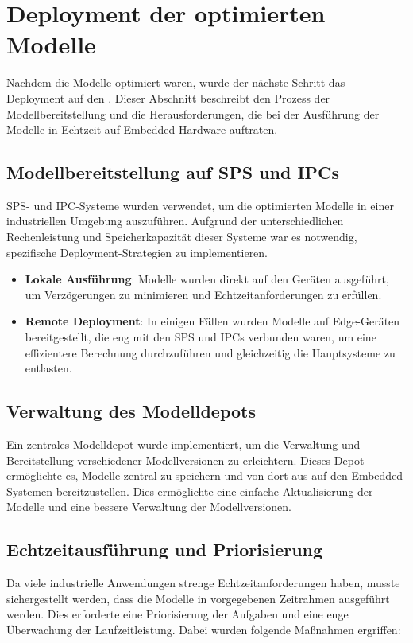 \section{Deployment der optimierten Modelle}
Nachdem die Modelle optimiert waren, wurde der nächste Schritt das Deployment auf den \Emb. Dieser Abschnitt beschreibt den Prozess der Modellbereitstellung 
und die Herausforderungen, die bei der Ausführung der Modelle in Echtzeit auf Embedded-Hardware auftraten.

\subsection{Modellbereitstellung auf SPS und IPCs}
SPS- und IPC-Systeme wurden verwendet, um die optimierten Modelle in einer industriellen Umgebung auszuführen. Aufgrund der unterschiedlichen Rechenleistung und 
Speicherkapazität dieser Systeme war es notwendig, spezifische Deployment-Strategien zu implementieren.

\begin{itemize}
    \item \textbf{Lokale Ausführung}: Modelle wurden direkt auf den Geräten ausgeführt, um Verzögerungen zu minimieren und Echtzeitanforderungen zu erfüllen.
    \item \textbf{Remote Deployment}: In einigen Fällen wurden Modelle auf Edge-Geräten bereitgestellt, die eng mit den SPS und IPCs verbunden waren, um eine 
    effizientere Berechnung durchzuführen und gleichzeitig die Hauptsysteme zu entlasten.
\end{itemize}

\subsection{Verwaltung des Modelldepots}
Ein zentrales Modelldepot wurde implementiert, um die Verwaltung und Bereitstellung verschiedener Modellversionen zu erleichtern. Dieses Depot ermöglichte es, 
Modelle zentral zu speichern und von dort aus auf den Embedded-Systemen bereitzustellen. Dies ermöglichte eine einfache Aktualisierung der Modelle und eine bessere 
Verwaltung der Modellversionen.

\subsection{Echtzeitausführung und Priorisierung}
Da viele industrielle Anwendungen strenge Echtzeitanforderungen haben, musste sichergestellt werden, dass die Modelle in vorgegebenen Zeitrahmen ausgeführt werden. 
Dies erforderte eine Priorisierung der Aufgaben und eine enge Überwachung der Laufzeitleistung. Dabei wurden folgende Maßnahmen ergriffen:

